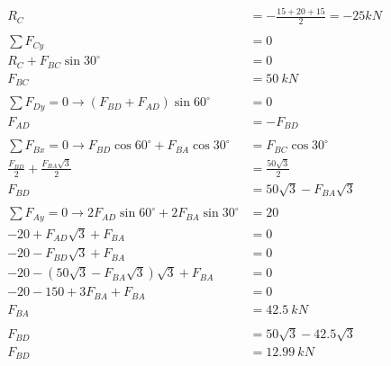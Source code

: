 \documentclass{article}
\begin{document}
\begin{align*}
    R_C                                                                   & = -\frac{15+20+15}{2} = -25kN \\
    \\
    \sum F_{Cy}                                                           & = 0                           \\
    R_C + F_{BC}\sin30^\circ                                              & = 0                           \\
    F_{BC}                                                                & = 50\ kN                      \\
    \\
    \sum F_{Dy} = 0 \rightarrow (F_{BD} + F_{AD})\sin60^\circ             & = 0                           \\
    F_{AD}                                                                & = -F_{BD}                     \\
    \\
    \sum F_{Bx} = 0 \rightarrow F_{BD}\cos60^\circ + F_{BA}\cos30^\circ   & = F_{BC}\cos30^\circ          \\
    \frac{F_{BD}}{2} + \frac{F_{BA}\sqrt{3}}{2}                           & = \frac{50\sqrt{3}}{2}        \\
    F_{BD}                                                                & = 50\sqrt{3}-F_{BA}\sqrt{3}   \\
    \\
    \sum F_{Ay} = 0 \rightarrow 2F_{AD}\sin60^\circ + 2F_{BA}\sin30^\circ & = 20                          \\
    -20 + F_{AD}\sqrt{3}  + F_{BA}                                        & = 0                           \\
    -20 - F_{BD}\sqrt{3}  + F_{BA}                                        & = 0                           \\
    -20 - (50\sqrt{3}-F_{BA}\sqrt{3})\sqrt{3}  + F_{BA}                   & = 0                           \\
    -20 - 150 + 3F_{BA} + F_{BA}                                          & = 0                           \\
    F_{BA}                                                                & = 42.5\ kN                    \\
    \\
    F_{BD}                                                                & = 50\sqrt{3}-42.5\sqrt{3}     \\
    F_{BD}                                                                & = 12.99\  kN                  \\
\end{align*}
\end{document}
